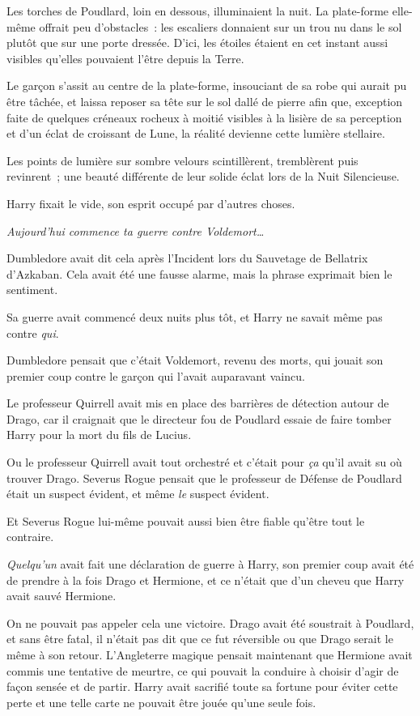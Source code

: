Les torches de Poudlard, loin en dessous, illuminaient la nuit. La plate-forme elle-même offrait peu d'obstacles~: les escaliers donnaient sur un trou nu dans le sol plutôt que sur une porte dressée. D'ici, les étoiles étaient en cet instant aussi visibles qu'elles pouvaient l'être depuis la Terre.

Le garçon s'assit au centre de la plate-forme, insouciant de sa robe qui aurait pu être tâchée, et laissa reposer sa tête sur le sol dallé de pierre afin que, exception faite de quelques créneaux rocheux à moitié visibles à la lisière de sa perception et d'un éclat de croissant de Lune, la réalité devienne cette lumière stellaire.

Les points de lumière sur sombre velours scintillèrent, tremblèrent puis revinrent~; une beauté différente de leur solide éclat lors de la Nuit Silencieuse.

Harry fixait le vide, son esprit occupé par d'autres choses.

\emph{Aujourd'hui commence ta guerre contre Voldemort…}

Dumbledore avait dit cela après l'Incident lors du Sauvetage de Bellatrix d'Azkaban. Cela avait été une fausse alarme, mais la phrase exprimait bien le sentiment.

Sa guerre avait commencé deux nuits plus tôt, et Harry ne savait même pas contre \emph{qui}.

Dumbledore pensait que c'était Voldemort, revenu des morts, qui jouait son premier coup contre le garçon qui l'avait auparavant vaincu.

Le professeur Quirrell avait mis en place des barrières de détection autour de Drago, car il craignait que le directeur fou de Poudlard essaie de faire tomber Harry pour la mort du fils de Lucius.

Ou le professeur Quirrell avait tout orchestré et c'était pour \emph{ça} qu'il avait su où trouver Drago. Severus Rogue pensait que le professeur de Défense de Poudlard était un suspect évident, et même \emph{le} suspect évident.

Et Severus Rogue lui-même pouvait aussi bien être fiable qu'être tout le contraire.

\emph{Quelqu'un} avait fait une déclaration de guerre à Harry, son premier coup avait été de prendre à la fois Drago et Hermione, et ce n'était que d'un cheveu que Harry avait sauvé Hermione.

On ne pouvait pas appeler cela une victoire. Drago avait été soustrait à Poudlard, et sans être fatal, il n'était pas dit que ce fut réversible ou que Drago serait le même à son retour. L'Angleterre magique pensait maintenant que Hermione avait commis une tentative de meurtre, ce qui pouvait la conduire à choisir d'agir de façon sensée et de partir. Harry avait sacrifié toute sa fortune pour éviter cette perte et une telle carte ne pouvait être jouée qu'une seule fois.

